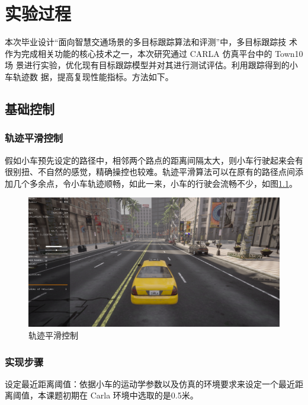\chapter{实验过程}

本次毕业设计“面向智慧交通场景的多目标跟踪算法和评测”中，多目标跟踪技 术作为完成相关功能的核心技术之一，本次研究通过 CARLA 仿真平台中的 Town10 场 景进行实验，优化现有目标跟踪模型并对其进行测试评估。利用跟踪得到的小车轨迹数 据，提高复现性能指标。方法如下。

\section{基础控制}
\subsection{轨迹平滑控制}

假如小车预先设定的路径中，相邻两个路点的距离间隔太大，则小车行驶起来会有很别扭、不自然的感觉，精确操控也较难。轨迹平滑算法可以在原有的路径点间添加几个多余点，令小车轨迹顺畅，如此一来，小车的行驶会流畅不少，如图\ref{fig:p9}。


\begin{figure}[htbp] %
	\centering
	\includegraphics[width=1\textwidth]{p9} %
	\caption{轨迹平滑控制} %
	\label{fig:p9} %
\end{figure}






\subsection{实现步骤}

设定最近距离阈值：依据小车的运动学参数以及仿真的环境要求来设定一个最近距离阈值，本课题初期在 Carla 环境中选取的是0.5米。


